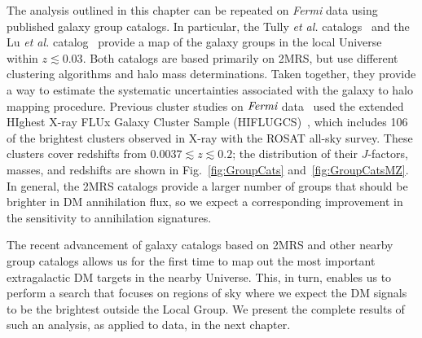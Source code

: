 The analysis outlined in this chapter can be repeated on \emph{Fermi} data using published galaxy group catalogs.  In particular, the Tully \emph{et al.} catalogs~\cite{Tully:2015opa,2017ApJ...843...16K} and the Lu \emph{et al.} catalog~\cite{Lu:2016vmu} provide a map of the galaxy groups in the local Universe within $z\lesssim0.03$.  Both catalogs are based primarily on 2MRS, but use different clustering algorithms and halo mass determinations.  
Taken together, they provide a way to estimate the systematic uncertainties associated with the galaxy to halo mapping procedure.  Previous cluster studies on $\emph{Fermi}$ data~\cite{Ackermann:2010rg, Ando:2012vu,Ackermann:2013iaq,Anderson:2015dpc,Liang:2016pvm} used the extended HIghest X-ray FLUx Galaxy Cluster Sample (HIFLUGCS)~\cite{Reiprich:2001zv,Chen:2007sz}, which includes 106 of the brightest clusters observed in X-ray with the ROSAT all-sky survey.  These clusters cover redshifts from $0.0037 \lesssim z\lesssim 0.2$; the distribution of their $J$-factors, masses, and redshifts are shown in Fig.~\ref{fig:GroupCats} and~\ref{fig:GroupCatsMZ}.  In general, the 2MRS catalogs provide a larger number of groups that should be brighter in DM annihilation flux, so we expect a corresponding improvement in the sensitivity to annihilation signatures.  

The recent advancement of galaxy catalogs based on 2MRS and other nearby group catalogs allows us for the first time to map out the most important extragalactic DM targets in the nearby Universe.  This, in turn, enables us to perform a search that focuses on regions of sky where we expect the DM signals to be the brightest outside the Local Group.  We present the complete results of such an analysis, as applied to data, in the next chapter.

